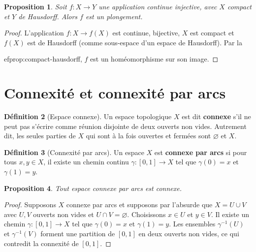 \documentclass[12pt,a4paper,openany]{book}
\theoremstyle{definition}
\newtheorem{definition}{Définition}[chapter]
\theoremstyle{plain}
\newtheorem{proposition}[definition]{Proposition}
\theoremstyle{remark}
\begin{document}
\begin{proposition}\label{prop:plongement-compact}
Soit $f : X \to Y$ une application continue injective, avec $X$ compact et $Y$
de Hausdorff. Alors $f$ est un plongement.
\end{proposition}

\begin{proof}
L'application $f : X \to f(X)$ est continue, bijective, $X$ est compact et
$f(X)$ est de Hausdorff (comme sous-espace d'un espace de Hausdorff). Par la

ef{prop:compact-hausdorff}, $f$ est un homéomorphisme sur son image.
\end{proof}

\section{Connexité et connexité par arcs}\label{sec:connexite}

\begin{definition}[Espace connexe]\label{def:connexe}
Un espace topologique $X$ est dit \textbf{connexe} s'il ne peut pas s'écrire
comme réunion disjointe de deux ouverts non vides. Autrement dit, les seules
parties de $X$ qui sont à la fois ouvertes et fermées sont $\varnothing$ et $X$.
\end{definition}

\begin{definition}[Connexité par arcs]\label{def:connexe-arcs}
Un espace $X$ est \textbf{connexe par arcs} si pour tous $x, y \in X$, il existe
un chemin continu $\gamma : [0,1] \to X$ tel que $\gamma(0) = x$ et
$\gamma(1) = y$.
\end{definition}

\begin{proposition}\label{prop:arc-connexe-implique-connexe}
Tout espace connexe par arcs est connexe.
\end{proposition}

\begin{proof}
Supposons $X$ connexe par arcs et supposons par l'absurde que $X = U \cup V$
avec $U, V$ ouverts non vides et $U \cap V = \varnothing$. Choisissons
$x \in U$ et $y \in V$. Il existe un chemin $\gamma : [0,1] \to X$ tel que
$\gamma(0) = x$ et $\gamma(1) = y$. Les ensembles $\gamma^{-1}(U)$ et
$\gamma^{-1}(V)$ forment une partition de $[0,1]$ en deux ouverts non vides,
ce qui contredit la connexité de $[0,1]$.
\end{proof}
\end{document}
